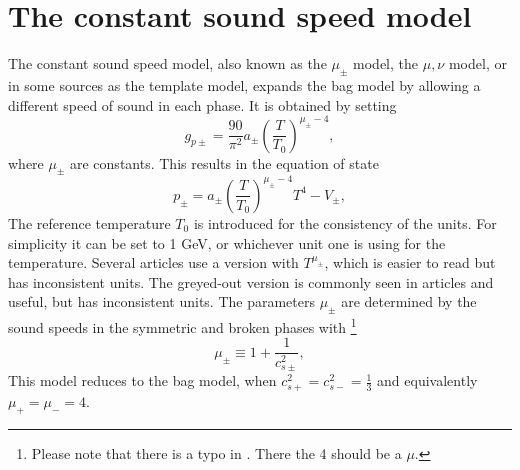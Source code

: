 \section{The constant sound speed model}
\label{const_cs}
The constant sound speed model, also known as the $\mu_\pm$ model, the $\mu, \nu$ model,
or in some sources as the template model,
expands the bag model by allowing a different speed of sound in each phase.
\cites{leitao_hydrodynamics_2015}{giese_2020}{giese_2021}
It is obtained by setting
\begin{equation}
g_{p\pm} = \frac{90}{\pi^2} a_\pm \left( \frac{T}{T_0} \right)^{\mu_\pm - 4},
\end{equation}
where $\mu_\pm$ are constants.
This results in the equation of state
\cites[eq. 15]{giese_2021}[eq. 38]{giese_2020}
\begin{equation}
p_\pm = a_\pm \left( \frac{T}{T_0} \right)^{\mu_\pm - 4} T^4 - V_\pm,
\end{equation}
The reference temperature $T_0$ is introduced for the consistency of the units.
For simplicity it can be set to 1 GeV, or whichever unit one is using for the temperature.
Several articles use a version with $T^{\mu_\pm}$, which is easier to read but has inconsistent units.
The greyed-out version is commonly seen in articles and useful, but has inconsistent units.
The parameters $\mu_\pm$ are determined by the sound speeds in the symmetric and broken phases with
\cites[eq. 16]{giese_2021}[eq. 39]{giese_2020}
\footnote{Please note that there is a typo in \cite[eq. 15]{giese_2021}. There the 4 should be a $\mu$.}
\begin{equation}
\mu_\pm \equiv 1 + \frac{1}{c_{s\pm}^2},
\end{equation}
This model reduces to the bag model,
when $c_{s+}^2 = c_{s-}^2 = \frac{1}{3}$
and equivalently
$\mu_+ = \mu_- = 4$.

